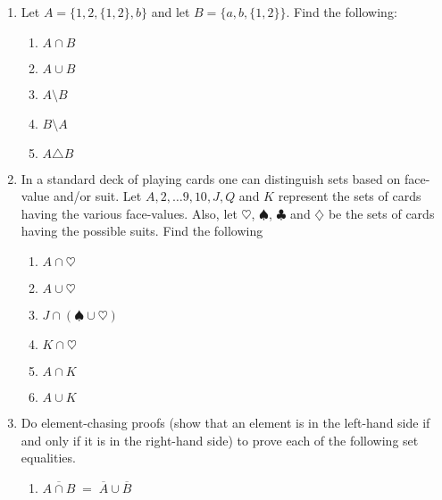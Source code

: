 \begin{enumerate}
\item Let $A = \{1, 2, \{1, 2\}, b\}$ and let $B=\{a, b, \{1, 2\} \}$.
Find the following:
  \begin{enumerate}
  \item $A \cap B$   
  \item $A \cup B$ 
  \item $A \setminus B$ 
  \item $B \setminus A$ 
  \item $A \triangle B$ 
  \end{enumerate}

\vfill

\item In a standard deck of playing cards one can distinguish sets
based on face-value and/or suit.  Let $A, 2, \ldots 9, 10, J, Q$ and $K$
represent the sets of cards having the various face-values.  Also, let
$\heartsuit$, $\spadesuit$, $\clubsuit$ and $\diamondsuit$ be the 
sets of cards having the possible suits.  Find the following
  \begin{enumerate}
  \item $A \cap \heartsuit$ 
  \item $A \cup \heartsuit$ 
  \item $J \cap (\spadesuit \cup \heartsuit)$ 
  \item $K \cap \heartsuit$ 
  \item $A \cap K$ \hint{$\emptyset$ }
  \item $A \cup K$ 
  \end{enumerate}

\vfill

\hintspagebreak

\item Do element-chasing proofs (show that an element is in the left-hand side if and only if it is in the right-hand side) to prove each of the following set equalities.  

  \begin{enumerate}
  \item $\overline{A\cap B} \; = \; \overline{A}\cup\overline{B}$


\end{enumerate}
\end{enumerate}
